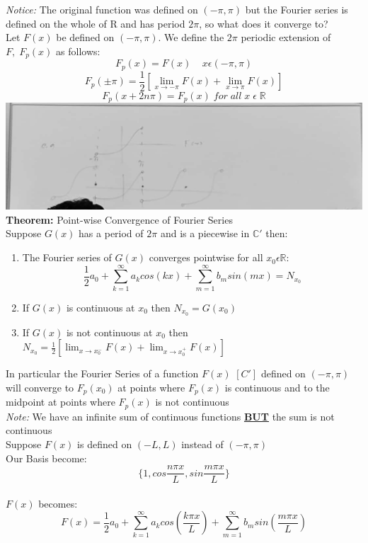 \documentclass[11pt]{article}
\theoremstyle{definition}
\newcommand{\C}{\mathbb{C}}
\newcommand{\R}{\mathbb{R}}
\begin{document}
\newpage
\textit{Notice:} The original function was defined on $(-\pi, \pi)$ but the Fourier series is defined on the whole of R and has period $2\pi$, so what does it converge to?\\
Let $F(x)$ be defined on $(-\pi, \pi)$. We define the $2\pi$ periodic extension of $F,\; F_p(x)$ as follows:
    $$F_p(x) = F(x)\;\;\;\; x \epsilon (-\pi, \pi)$$
    $$F_p(\pm\pi) = \frac{1}{2} [\lim_{x \to -\pi}F(x) + \lim_{x \to \pi}F(x)]$$
    $$F_p(x+2n\pi) = F_p(x)\; for\; all\; x\;\epsilon\; \R$$
    \includegraphics[width=\textwidth]{fourier1.jpg}\\

\textbf{Theorem:} Point-wise Convergence of Fourier Series\\
Suppose $G(x)$ has a period of $2\pi$ and is a piecewise in $\C'$ then:
\begin{enumerate}[topsep=-10pt]
    \item The Fourier series of $G(x)$ converges pointwise for all $x_0 \epsilon \R$:
    $$\frac{1}{2}a_0 + \sum ^\infty_{k=1}a_kcos(kx) + \sum ^\infty_{m=1}b_msin(mx) = N_{x_0}$$
    \item If $G(x)$ is continuous at $x_0$ then $N_{x_0} = G(x_0)$
    \item If $G(x)$ is not continuous at $x_0$ then $N_{x_0} = \frac{1}{2} [\lim_{x \to x_0^-}F(x) + \lim_{x \to x_0^+}F(x)]$
\end{enumerate}
In particular the Fourier Series of a function $F(x)$   $[C']$ defined on $(-\pi, \pi)$ will converge to $F_p(x_0)$ at points where $F_p(x)$ is continuous and to the midpoint at points where $F_p(x)$ is not continuous\\
\textit{Note:} We have an infinite sum of continuous functions \textbf{\underline{BUT}} the sum is not continuous\\
Suppose $F(x)$ is defined on $(-L, L)$ instead of $(-\pi, \pi)$\\
Our Basis become: $$\{1, cos\frac{n\pi x}{L}, sin\frac{m\pi x}{L}\}$$\\
$F(x)$ becomes: $$F(x) = \frac{1}{2}a_0 + \sum ^\infty_{k=1}a_kcos(\frac{k \pi x}{L}) + \sum ^\infty_{m=1}b_msin(\frac{m \pi x}{L})$$
\end{document}
